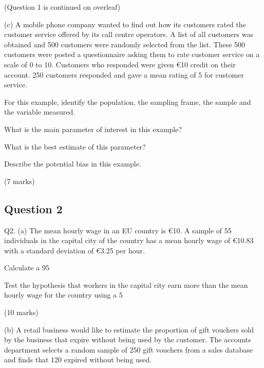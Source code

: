 (Question 1 is continued on overleaf)

(c) A mobile phone company wanted to find out how its customers rated the customer service offered by its call centre operators. A list of all customers was obtained and 500 customers were randomly selected from the list. These 500 customers were posted a questionnaire asking them to rate customer service on a scale of 0 to 10. Customers who responded were given €10 credit on their account. 250 customers responded and gave a mean rating of 5 for customer service.

\item[(i)] For this example, identify the population, the sampling frame, the sample and the variable measured.

\item[(ii)] What is the main parameter of interest in this example?

\item[(iii)] What is the best estimate of this parameter?

\item[(iv)] Describe the potential bias in this example.

(7 marks)

\newpage
\subsection*{Question 2}

Q2. (a) The mean hourly wage in an EU country is €10. A sample of 55 individuals in the capital city of the country has a mean hourly wage of €10.83 with a standard deviation of €3.25 per hour.

\item[(i)] Calculate a 95%

\item[(ii)] Test the hypothesis that workers in the capital city earn more than the mean hourly wage for the country using a 5%

(10 marks)

(b) A retail business would like to estimate the proportion of gift vouchers sold by the business that expire without being used by the customer. The accounts department selects a random sample of 250 gift vouchers from a sales database and finds that 120 expired without being used.

